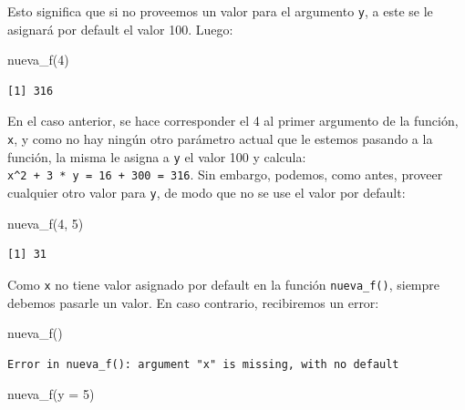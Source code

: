 \documentclass[
]{book}
\newenvironment{Shaded}{\begin{snugshade}}{\end{snugshade}}
\newcommand{\AttributeTok}[1]{\textcolor[rgb]{0.77,0.63,0.00}{#1}}
\newcommand{\DecValTok}[1]{\textcolor[rgb]{0.00,0.00,0.81}{#1}}
\newcommand{\FunctionTok}[1]{\textcolor[rgb]{0.00,0.00,0.00}{#1}}
\newcommand{\NormalTok}[1]{#1}
\begin{document}
Esto significa que si no proveemos un valor para el argumento \texttt{y}, a este se le asignará por default el valor 100. Luego:

\begin{Shaded}
\begin{Highlighting}[]
\FunctionTok{nueva\_f}\NormalTok{(}\DecValTok{4}\NormalTok{)}
\end{Highlighting}
\end{Shaded}

\begin{verbatim}
[1] 316
\end{verbatim}

En el caso anterior, se hace corresponder el 4 al primer argumento de la función, \texttt{x}, y como no hay ningún otro parámetro actual que le estemos pasando a la función, la misma le asigna a \texttt{y} el valor 100 y calcula: \texttt{x\^{}2\ +\ 3\ *\ y\ =\ 16\ +\ 300\ =\ 316}. Sin embargo, podemos, como antes, proveer cualquier otro valor para \texttt{y}, de modo que no se use el valor por default:

\begin{Shaded}
\begin{Highlighting}[]
\FunctionTok{nueva\_f}\NormalTok{(}\DecValTok{4}\NormalTok{, }\DecValTok{5}\NormalTok{)}
\end{Highlighting}
\end{Shaded}

\begin{verbatim}
[1] 31
\end{verbatim}

Como \texttt{x} no tiene valor asignado por default en la función \texttt{nueva\_f()}, siempre debemos pasarle un valor. En caso contrario, recibiremos un error:

\begin{Shaded}
\begin{Highlighting}[]
\FunctionTok{nueva\_f}\NormalTok{()}
\end{Highlighting}
\end{Shaded}

\begin{verbatim}
Error in nueva_f(): argument "x" is missing, with no default
\end{verbatim}

\begin{Shaded}
\begin{Highlighting}[]
\FunctionTok{nueva\_f}\NormalTok{(}\AttributeTok{y =} \DecValTok{5}\NormalTok{)}
\end{Highlighting}
\end{Shaded}
\end{document}

